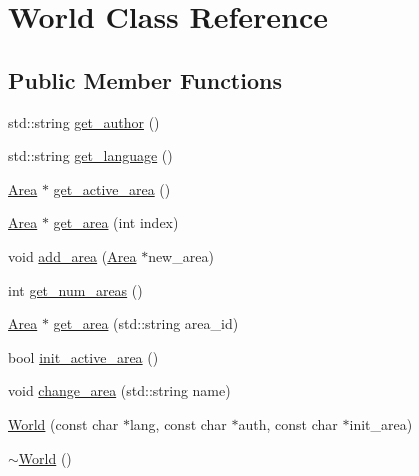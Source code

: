\hypertarget{class_world}{
\section{\-World \-Class \-Reference}
\label{class_world}
}
\subsection*{\-Public \-Member \-Functions}
\begin{DoxyCompactItemize}
\item 
std\-::string \hyperlink{class_world_a13598968c1b4061eb1529cdcb0755372}{get\-\_\-author} ()
\item 
std\-::string \hyperlink{class_world_add6a887b9f085ec8d137b8f1f9e8de6c}{get\-\_\-language} ()
\item 
\hyperlink{class_area}{\-Area} $\ast$ \hyperlink{class_world_a8339c4c339f17bbea73ee0e9d32dc547}{get\-\_\-active\-\_\-area} ()
\item 
\hyperlink{class_area}{\-Area} $\ast$ \hyperlink{class_world_ac7e22e2323d311975c288496ca755bff}{get\-\_\-area} (int index)
\item 
void \hyperlink{class_world_a64eb27a4ea7aaf9d36178e902676e8fe}{add\-\_\-area} (\hyperlink{class_area}{\-Area} $\ast$new\-\_\-area)
\item 
int \hyperlink{class_world_a85cfec55f3135621a8a4a1f438f5cb93}{get\-\_\-num\-\_\-areas} ()
\item 
\hyperlink{class_area}{\-Area} $\ast$ \hyperlink{class_world_af31d16d13344c6f61b6aab34b34fab4b}{get\-\_\-area} (std\-::string area\-\_\-id)
\item 
bool \hyperlink{class_world_a8dadd0ff476194c1c6de68338d2012cf}{init\-\_\-active\-\_\-area} ()
\item 
void \hyperlink{class_world_a2a47dcf3eb1e54a2da3729018c34d53f}{change\-\_\-area} (std\-::string name)
\item 
\hyperlink{class_world_a5d24f8974db6e08f1938389ad8937c3e}{\-World} (const char $\ast$lang, const char $\ast$auth, const char $\ast$init\-\_\-area)
\item 
\hyperlink{class_world_a8c73fba541a5817fff65147ba47cd827}{$\sim$\-World} ()
\end{DoxyCompactItemize}
